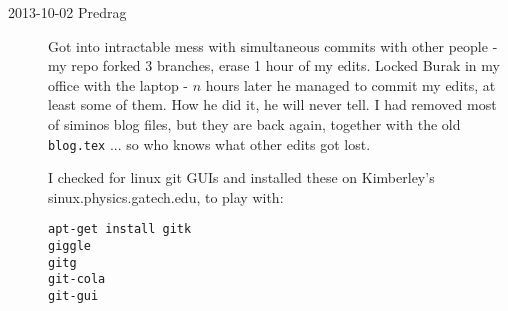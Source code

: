 \begin{description}
\item[2013-10-02 Predrag] Got into intractable mess with simultaneous commits with other
people - my repo forked 3 branches, erase 1 hour of my edits. Locked Burak in my office
with the laptop - $n$ hours later he managed to commit my edits, at least some of them.
How he did it, he will never tell.
I had removed most of siminos blog files, but they are back again, together with the old
\texttt{blog.tex} ... so who knows what
other edits got lost.

I checked for linux
\HREF{} {git GUIs} and installed these on Kimberley's sinux.physics.gatech.edu,
to play with:

\texttt{apt-get install gitk}
\\
     \texttt{giggle}
\\
     \texttt{gitg}
\\
    \texttt{git-cola}
 \\
    \texttt{git-gui}


\end{description}
